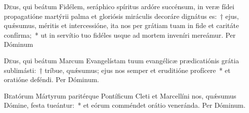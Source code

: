 \documentclass[vesperale_romanum.tex]{subfiles}
\begin{document}
\duplex

\oratio

\lettrine{D}{e}us, qui beátum Fidélem, seráphico spíritus ardóre succénsum, in veræ fídei propagatióne martýrii palma et gloriósis miráculis decoráre dignátus es:~† ejus, quǽsumus, méritis et intercessióne, ita nos per grátiam tuam in fide et caritáte confírma;~* ut in servítio tuo fidéles usque ad mortem inveníri mereámur.
Per Dóminum 


\vespsequentiscomm

\myrule
{}


\oratio

\lettrine{D}{e}us, qui beátum Marcum Evangelístam tuum evangélicæ prædicatiónis grátia sublimásti:~† tríbue, quǽsumus; ejus nos semper et eruditióne profícere~* et oratióne deféndi.
Per Dóminum.



\commsequentis

\myrule
\newpage


\semiduplex


\oratio

\lettrine{B}{e}atórum Mártyrum paritérque Pontíficum Cleti et Marcellíni nos, quǽsumus Dómine, festa tueántur:~* et eórum comméndet orátio veneránda. Per Dóminum.

\vespsequentiscomm

\myrule
{}
\end{document}
